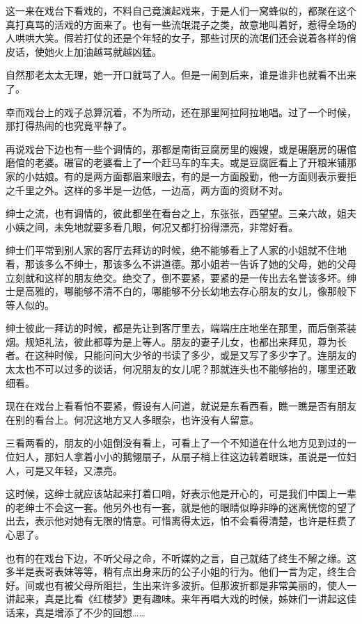 \documentclass[UTF8]{ctexart}
\begin{document}
这一来在戏台下看戏的，不料自己竟演起戏来，于是人们一窝蜂似的，都聚在这个真打真骂的活戏的方面来了。也有一些流氓混子之类，故意地叫着好，惹得全场的人哄哄大笑。假若打仗的还是个年轻的女子，那些讨厌的流氓们还会说着各样的俏皮话，使她火上加油越骂就越凶猛。

自然那老太太无理，她一开口就骂了人。但是一闹到后来，谁是谁非也就看不出来了。

幸而戏台上的戏子总算沉着，不为所动，还在那里阿拉阿拉地唱。过了一个时候，那打得热闹的也究竟平静了。

再说戏台下边也有一些个调情的，那都是南街豆腐房里的嫂嫂，或是碾磨房的碾倌磨倌的老婆。碾官的老婆看上了一个赶马车的车夫。或是豆腐匠看上了开粮米铺那家的小姑娘。有的是两方面都眉来眼去，有的是一方面殷勤，他一方面则表示要拒之千里之外。这样的多半是一边低，一边高，两方面的资财不对。

绅士之流，也有调情的，彼此都坐在看台之上，东张张，西望望。三亲六故，姐夫小姨之间，未免地就要多看几眼，何况又都打扮得漂亮，非常好看。

绅士们平常到别人家的客厅去拜访的时候，绝不能够看上了人家的小姐就不住地看，那该多么不绅士，那该多么不讲道德。那小姐若一告诉了她的父母，她的父母立刻就和这样的朋友绝交。绝交了，倒不要紧，要紧的是一传出去名誉该多坏。绅士是高雅的，哪能够不清不白的，哪能够不分长幼地去存心朋友的女儿，像那般下等人似的。

绅士彼此一拜访的时候，都是先让到客厅里去，端端庄庄地坐在那里，而后倒茶装烟。规矩礼法，彼此都尊为是上等人。朋友的妻子儿女，也都出来拜见，尊为长者。在这种时候，只能问问大少爷的书读了多少，或是又写了多少字了。连朋友的太太也不可以过多的谈话，何况朋友的女儿呢？那就连头也不能够抬的，哪里还敢细看。

现在在戏台上看看怕不要紧，假设有人问道，就说是东看西看，瞧一瞧是否有朋友在别的看台上。何况这地方又人多眼杂，也许没有人留意。

三看两看的，朋友的小姐倒没有看上，可看上了一个不知道在什么地方见到过的一位妇人，那妇人拿着小小的鹅翎扇子，从扇子梢上往这边转着眼珠，虽说是一位妇人，可是又年轻，又漂亮。

这时候，这绅士就应该站起来打着口哨，好表示他是开心的，可是我们中国上一辈的老绅士不会这一套。他另外也有一套，就是他的眼睛似睁非睁的迷离恍惚的望了出去，表示他对她有无限的情意。可惜离得太远，怕不会看得清楚，也许是枉费了心思了。

也有的在戏台下边，不听父母之命，不听媒妁之言，自己就结了终生不解之缘。这多半是表哥表妹等等，稍有点出身来历的公子小姐的行为。他们一言为定，终生合好。间或也有被父母所阻拦，生出来许多波折。但那波折都是非常美丽的，使人一讲起来，真是比看《红楼梦》更有趣味。来年再唱大戏的时候，姊妹们一讲起这佳话来，真是增添了不少的回想……
\end{document}
